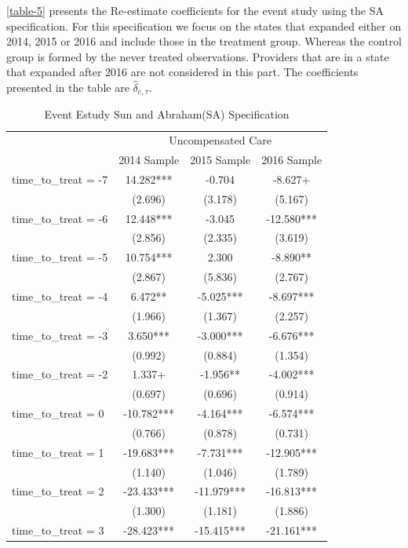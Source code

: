 \documentclass[
  12pt,
]{article}
\begin{document}
\ref{table-5} presents the Re-estimate coefficients for the event study
using the SA specification. For this specification we focus on the
states that expanded either on 2014, 2015 or 2016 and include those in
the treatment group. Whereas the control group is formed by the never
treated observations. Providers that are in a state that expanded after
2016 are not considered in this part. The coefficients presented in the
table are \(\hat{\delta}_{e, \tau}\).

\begin{table}

\caption{\label{tab:Tab-4}Event Estudy Sun and Abraham(SA) Specification}
\centering
\begin{tabular}[t]{lccc}
\toprule
\multicolumn{1}{c}{ } & \multicolumn{3}{c}{Uncompensated Care} \\
\cmidrule(l{3pt}r{3pt}){2-4}
  & 2014 Sample & 2015 Sample & 2016 Sample\\
\midrule
time\_to\_treat = -7 & 14.282*** & -0.704 & -8.627+\\
 & (2.696) & (3.178) & (5.167)\\
time\_to\_treat = -6 & 12.448*** & -3.045 & -12.580***\\
 & (2.856) & (2.335) & (3.619)\\
time\_to\_treat = -5 & 10.754*** & 2.300 & -8.890**\\
 & (2.867) & (5.836) & (2.767)\\
time\_to\_treat = -4 & 6.472** & -5.025*** & -8.697***\\
 & (1.966) & (1.367) & (2.257)\\
time\_to\_treat = -3 & 3.650*** & -3.000*** & -6.676***\\
 & (0.992) & (0.884) & (1.354)\\
time\_to\_treat = -2 & 1.337+ & -1.956** & -4.002***\\
 & (0.697) & (0.696) & (0.914)\\
time\_to\_treat = 0 & -10.782*** & -4.164*** & -6.574***\\
 & (0.766) & (0.878) & (0.731)\\
time\_to\_treat = 1 & -19.683*** & -7.731*** & -12.905***\\
 & (1.140) & (1.046) & (1.789)\\
time\_to\_treat = 2 & -23.433*** & -11.979*** & -16.813***\\
 & (1.300) & (1.181) & (1.886)\\
time\_to\_treat = 3 & -28.423*** & -15.415*** & -21.161***\\

\end{tabular}
\end{table}
\end{document}
